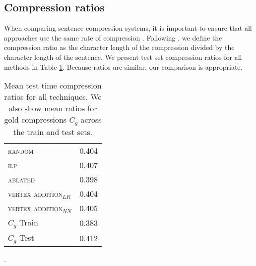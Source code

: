 \subsection{Compression ratios}

When comparing sentence compression systems, it is important to ensure that all approaches use the same rate of compression \cite{napoles2011evaluating}. Following \citet{filippova2015sentence}, we define the compression ratio as the character length of the compression divided by the character length of the sentence. We present test set compression ratios for all methods in Table \ref{t:cr}. Because ratios are similar, our comparison is appropriate.

\begin{table}[htb!]
\centering
\begin{tabular}{@{}l | l@{}}
\textsc{random} & 0.404\\ 
\textsc{ilp} &  0.407 \\
\textsc{ablated} & 0.398 \\
\textsc{vertex addition}$_{LR}$ &  0.404  \\
\textsc{vertex addition}$_{NN}$ &  0.405  \\ \midrule
$C_g$ Train  & 0.383 \\
$C_g$ Test   & 0.412 \\
\end{tabular}
\caption{Mean test time compression ratios for all techniques. We also show mean ratios for gold compressions $C_g$ across the train and test sets.}\label{t:cr}.
\end{table}

